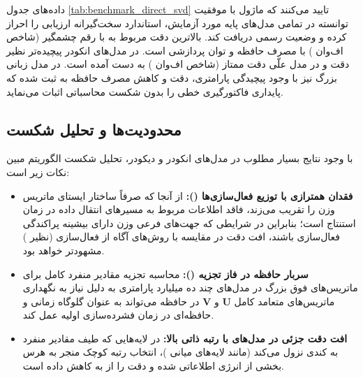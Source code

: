 داده‌های جدول \ref{tab:benchmark_direct_svd} تایید می‌کنند که ماژول  با موفقیت توانسته در تمامی مدل‌های پایه مورد آزمایش، استاندارد سخت‌گیرانه ارزیابی را احراز کرده و وضعیت رسمی  دریافت کند. بالاترین دقت مربوط به  با رقم چشمگیر  (شاخص اف‌وان ) با مصرف حافظه  و توان پردازشی  است. در مدل‌های انکودر پیچیده‌تر نظیر  دقت  و در مدل علّی  دقت ممتاز  (شاخص اف‌وان ) به دست آمده است. در مدل زبانی بزرگ  نیز با وجود پیچیدگی پارامتری، دقت  و کاهش مصرف حافظه به  ثبت شده که پایداری فاکتورگیری خطی را بدون شکست محاسباتی اثبات می‌نماید.

\subsection{محدودیت‌ها و تحلیل شکست}
با وجود نتایج بسیار مطلوب در مدل‌های انکودر و دیکودر، تحلیل شکست الگوریتم مبین نکات زیر است:
\begin{itemize}
    \item \textbf{فقدان همترازی با توزیع فعال‌سازی‌ها ():} از آنجا که  صرفاً ساختار ایستای ماتریس وزن را تقریب می‌زند، فاقد اطلاعات مربوط به مسیرهای انتقال داده در زمان استنتاج است؛ بنابراین در شرایطی که جهت‌های فرعی وزن دارای بیشینه پراکندگی فعال‌سازی باشند، افت دقت در مقایسه با روش‌های آگاه از فعال‌سازی (نظیر ) مشهودتر خواهد بود.
    \item \textbf{سربار حافظه در فاز تجزیه ():} محاسبه تجزیه مقادیر منفرد کامل برای ماتریس‌های فوق بزرگ در مدل‌های چند ده میلیارد پارامتری به دلیل نیاز به نگهداری ماتریس‌های متعامد کامل $\mathbf{U}$ و $\mathbf{V}$ در حافظه  می‌تواند به عنوان گلوگاه زمانی و حافظه‌ای در زمان فشرده‌سازی اولیه عمل کند.
    \item \textbf{افت دقت جزئی در مدل‌های با رتبه ذاتی بالا:} در لایه‌هایی که طیف مقادیر منفرد به کندی نزول می‌کند (مانند لایه‌های میانی )، انتخاب رتبه کوچک منجر به هرس بخشی از انرژی اطلاعاتی شده و دقت را از  به  کاهش داده است.
\end{itemize}
